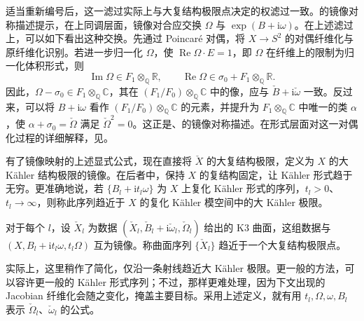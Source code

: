 适当重新编号后，这一滤过实际上与大复结构极限点决定的权滤过一致。的镜像对称描述提示，在上同调层面，镜像对合应交换 $\Omega$ 与 $\exp(B+\mathrm i\omega)$。在上述滤过上，可以如下看出这种交换。先通过 Poincaré 对偶，将 $X\to S^2$ 的对偶纤维化与原纤维化识别。若进一步归一化 $\Omega$，使 $\operatorname{Re}\Omega\cdot E=1$，即 $\Omega$ 在纤维上的限制为归一化体积形式，则
\[
\operatorname{Im}\Omega\in F_1\otimes_{\mathbb Q}\mathbb R,
\qquad\operatorname{Re}\Omega\in\sigma_0+F_1\otimes_{\mathbb Q}\mathbb R.
\]
因此，$\Omega-\sigma_0\in F_1\otimes_{\mathbb Q}\mathbb C$，其在 $(F_1/F_0)\otimes_{\mathbb Q}\mathbb C$ 中的像，应与 $\check B+\mathrm i\check\omega$ 一致。反过来，可以将 $B+\mathrm i\omega$ 看作 $(F_1/F_0)\otimes_{\mathbb Q}\mathbb C$ 的元素，并提升为 $F_1\otimes_{\mathbb Q}\mathbb C$ 中唯一的类 $\alpha$，使 $\alpha+\sigma_0=\check\Omega$ 满足 $\check\Omega^2=0$。这正是、的镜像对称描述。在形式层面对这一对偶化过程的详细解释，见。

有了镜像映射的上述显式公式，现在直接将 $\check X$ 的大复结构极限，定义为 $X$ 的大 Kähler 结构极限的镜像。在后者中，保持 $X$ 的复结构固定，让 Kähler 形式趋于无穷。更准确地说，若 $\{B_l+\mathrm i t_l\omega\}$ 为 $X$ 上复化 Kähler 形式的序列，$t_l>0$、$t_l\to\infty$，则称此序列趋近于 $X$ 的复化 Kähler 模空间中的大 Kähler 极限。

\begin{definition}\label{def:7.24}
对于每个 $l$，设 $\check X_l$ 为数据 $(\check X_l,\check B_l+\mathrm i\check\omega_l,\check\Omega_l)$ 给出的 K3 曲面，这组数据与 $(X,B_l+\mathrm i t_l\omega,t_l\Omega)$ 互为镜像。称曲面序列 $\{\check X_l\}$ 趋近于一个大复结构极限点。
\end{definition}

实际上，这里稍作了简化，仅沿一条射线趋近大 Kähler 极限。更一般的方法，可以容许更一般的 Kähler 形式序列；不过，那样更难处理，因为下文出现的 Jacobian 纤维化会随之变化，掩盖主要目标。采用上述定义，就有用 $t_l,\Omega,\omega,B_l$ 表示 $\check\Omega_l$、$\check\omega_l$ 的公式。

